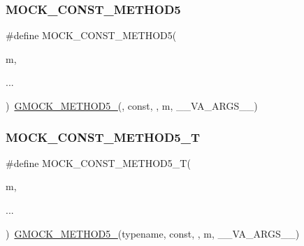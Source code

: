 \mbox{\label{_obj__test_2lib_2googletest-release-1_88_81_2googlemock_2include_2gmock_2gmock-generated-function-mockers_8h_ab7021ec2b869e7c9ea90363ee675f19b}} 
\subsubsection{\texorpdfstring{MOCK\_CONST\_METHOD5}{MOCK\_CONST\_METHOD5}}
{\footnotesize\ttfamily \#define M\+O\+C\+K\+\_\+\+C\+O\+N\+S\+T\+\_\+\+M\+E\+T\+H\+O\+D5(\begin{DoxyParamCaption}\item[{}]{m,  }\item[{}]{... }\end{DoxyParamCaption})~\mbox{\hyperlink{_obj__test_2lib_2googletest-release-1_88_81_2googlemock_2include_2gmock_2gmock-generated-function-mockers_8h_a9e3ecd392499ab19a4a6d3adcabf56f6}{G\+M\+O\+C\+K\+\_\+\+M\+E\+T\+H\+O\+D5\+\_\+}}(, const, , m, \+\_\+\+\_\+\+V\+A\+\_\+\+A\+R\+G\+S\+\_\+\+\_\+)}

\mbox{\label{_obj__test_2lib_2googletest-release-1_88_81_2googlemock_2include_2gmock_2gmock-generated-function-mockers_8h_a37d02091cf2e4d31c11f38609d12a815}} 
\subsubsection{\texorpdfstring{MOCK\_CONST\_METHOD5\_T}{MOCK\_CONST\_METHOD5\_T}}
{\footnotesize\ttfamily \#define M\+O\+C\+K\+\_\+\+C\+O\+N\+S\+T\+\_\+\+M\+E\+T\+H\+O\+D5\+\_\+T(\begin{DoxyParamCaption}\item[{}]{m,  }\item[{}]{... }\end{DoxyParamCaption})~\mbox{\hyperlink{_obj__test_2lib_2googletest-release-1_88_81_2googlemock_2include_2gmock_2gmock-generated-function-mockers_8h_a9e3ecd392499ab19a4a6d3adcabf56f6}{G\+M\+O\+C\+K\+\_\+\+M\+E\+T\+H\+O\+D5\+\_\+}}(typename, const, , m, \+\_\+\+\_\+\+V\+A\+\_\+\+A\+R\+G\+S\+\_\+\+\_\+)}

